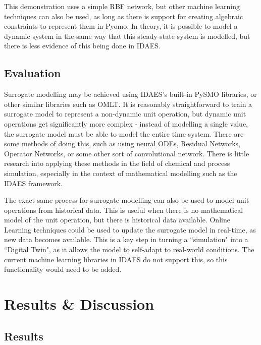 \documentclass[12pt]{article}
\begin{document}
This demonstration uses a simple RBF network, but other machine learning techniques can also be used, as long as there is support for creating algebraic constraints to represent them in Pyomo. In theory, it is possible to model a dynamic system in the same way that this steady-state system is modelled, but there is less evidence of this being done in IDAES.

\subsection{Evaluation}



Surrogate modelling may be achieved using IDAES's built-in PySMO libraries, or other similar libraries such as OMLT. 
It is reasonably straightforward to train a surrogate model to represent a non-dynamic unit operation, but dynamic unit operations get significantly more complex - instead of modelling a single value, the surrogate model must be able to model the entire time system. There are some methods of doing this, such as using neural ODEs, Residual Networks, Operator Networks, or some other sort of convolutional network. 
There is little research into applying these methods in the field of chemical and process simulation, especially in the context of mathematical modelling such as the IDAES framework.

The exact same process for surrogate modelling can also be used to model unit operations from historical data. 
This is useful when there is no mathematical model of the unit operation, but there is historical data available. 
Online Learning techniques could be used to update the surrogate model in real-time, as new data becomes available. This is a key step in turning a ``simulation" into a ``Digital Twin", as it allows the model to self-adapt to real-world conditions. The current machine learning libraries in IDAES do not support this, so this functionality would need to be added.





\section{Results \& Discussion}
\subsection{Results}
\end{document}
